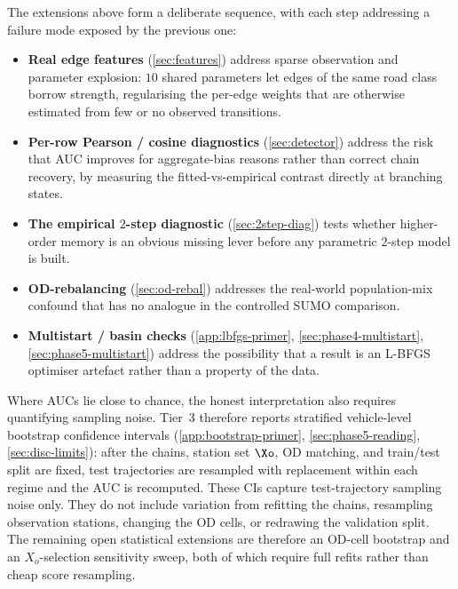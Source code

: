 The extensions above form a deliberate sequence, with each step addressing
a failure mode exposed by the previous one:
\begin{itemize}
\item \textbf{Real edge features} (\cref{sec:features}) address sparse
observation and parameter explosion: $10$ shared parameters let edges of
the same road class borrow strength, regularising the per-edge weights
that are otherwise estimated from few or no observed transitions.
\item \textbf{Per-row Pearson / cosine diagnostics} (\cref{sec:detector})
address the risk that AUC improves for aggregate-bias reasons rather than
correct chain recovery, by measuring the fitted-vs-empirical contrast
directly at branching states.
\item \textbf{The empirical $2$-step diagnostic} (\cref{sec:2step-diag})
tests whether higher-order memory is an obvious missing lever before any
parametric $2$-step model is built.
\item \textbf{OD-rebalancing} (\cref{sec:od-rebal}) addresses the
real-world population-mix confound that has no analogue in the controlled
SUMO comparison.
\item \textbf{Multistart / basin checks} (\cref{app:lbfgs-primer},
\cref{sec:phase4-multistart},
\cref{sec:phase5-multistart}) address the possibility that a result is an
L-BFGS optimiser artefact rather than a property of the data.
\end{itemize}
Where AUCs lie close to chance, the honest interpretation also requires
quantifying sampling noise. Tier~3 therefore reports stratified
vehicle-level bootstrap confidence intervals
(\cref{app:bootstrap-primer}, \cref{sec:phase5-reading},
\cref{sec:disc-limits}): after the chains,
station set $\Xo$, OD matching, and train/test split are fixed, test
trajectories are resampled with replacement within each regime and the
AUC is recomputed. These CIs capture test-trajectory sampling noise only.
They do not include variation from refitting the chains, resampling
observation stations, changing the OD cells, or redrawing the validation
split. The remaining open statistical extensions are therefore an
OD-cell bootstrap and an $X_o$-selection sensitivity sweep, both of which
require full refits rather than cheap score resampling.
